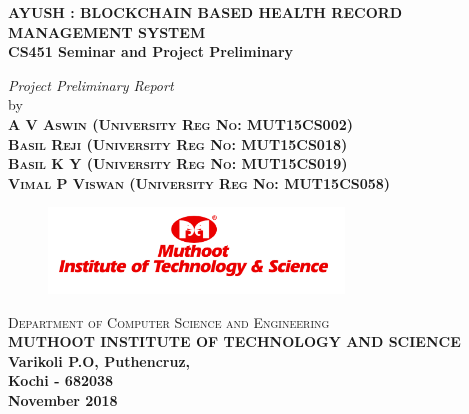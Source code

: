 \documentclass[11pt]{report}
\begin{document}
\renewcommand\bibname{References}
\pagestyle{fancy}
\fancyhead{}
\fancyfoot{}
\fancyfoot[c]{\thepage}
\renewcommand{\chaptermark}[1]{
\markboth{\thechapter.\ #1}{}} 
\renewcommand{\headrulewidth}{0.1pt}
\fancyhead[r]{\slshape \leftmark}
\addtolength{\headheight}{\baselineskip}
\addtolength{\headsep}{.1in}
\lhead{\nouppercase{\rightmark}}
\rhead{\footnotesize{\nouppercase{\leftmark}}}

\begin{titlepage}
\begin{center}

\LARGE{\textbf{AYUSH : BLOCKCHAIN BASED HEALTH
RECORD MANAGEMENT SYSTEM}}\\
\vspace{0.15in}
\large{\textbf{CS451 Seminar and Project Preliminary\\}}
\vspace{1in}

\textit{Project Preliminary Report} \\[0.75cm] 

by\\[0.5cm]
\textsc{\textbf{A V Aswin (University Reg No: MUT15CS002)}}\\[0.25cm] %
\textsc{\textbf{Basil Reji (University Reg No: MUT15CS018)}}\\[0.25cm] %
\textsc{\textbf{Basil K Y (University Reg No: MUT15CS019)}}\\[0.25cm] %
\textsc{\textbf{Vimal P Viswan (University Reg No: MUT15CS058)}}\\[0.25cm] %

\vspace{1in}
\begin{figure}[h]
\begin{center}
\includegraphics[width=0.7\textwidth]{logo1.png}\\
\end{center}
\end{figure}
\vspace{-0.5cm}
\textsc{Department of Computer Science and Engineering}\\[0.10cm]
\textsc{\textbf{MUTHOOT INSTITUTE OF TECHNOLOGY AND SCIENCE}}\\[0.10cm]
\textbf{Varikoli P.O, Puthencruz,}\\[0.10cm]
\textbf{Kochi - 682038}\\
\vspace{0.3in}
{\upshape \textbf{November 2018}} %
\end{center}
\end{titlepage}
\end{document}
